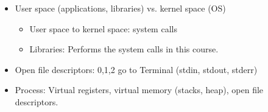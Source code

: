 \begin{summary}
    \begin{itemize}
        \item User space (applications, libraries) vs. kernel space (OS)
        \begin{itemize}
            \item User space to kernel space: system calls
            \item Libraries: Performs the system calls in this course.
        \end{itemize}
        \item Open file descriptors: 0,1,2 go to Terminal (stdin, stdout, stderr)
        \item Process: Virtual registers, virtual memory (stacks, heap), open file descriptors.
    \end{itemize}
\end{summary}

